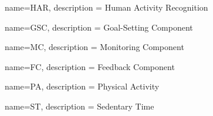 
{
  name=HAR,
  description = {Human Activity Recognition}
}

{
    name=GSC,
    description = {Goal-Setting Component}
}

{
    name=MC,
    description = {Monitoring Component}
}

{
    name=FC,
    description = {Feedback Component}
}

{
    name=PA,
    description = {Physical Activity}
}

{
    name=ST,
    description = {Sedentary Time}
}

\glsaddall %
\printglossaries